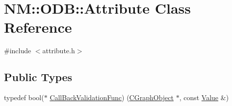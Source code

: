\hypertarget{class_n_m_1_1_o_d_b_1_1_attribute}{}\section{N\+M\+:\+:O\+D\+B\+:\+:Attribute Class Reference}
\label{class_n_m_1_1_o_d_b_1_1_attribute}


{\ttfamily \#include $<$attribute.\+h$>$}

\subsection*{Public Types}
\begin{DoxyCompactItemize}
\item 
typedef bool($\ast$ \hyperlink{class_n_m_1_1_o_d_b_1_1_attribute_aecc2c30f3a77a56c4dc68b9961eb1fb7}{Call\+Back\+Validation\+Func}) (\hyperlink{class_n_m_1_1_o_d_b_1_1_c_graph_object}{C\+Graph\+Object} $\ast$, const \hyperlink{class_n_m_1_1_o_d_b_1_1_value}{Value} \&)
\end{DoxyCompactItemize}
